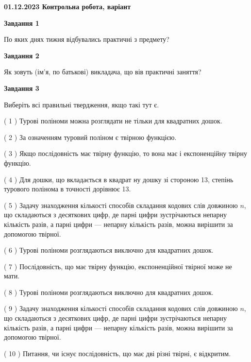 \documentclass[12pt, ukrainian]{article}
\begin{document}
\begin {large}

\textbf{01.12.2023 Контрольна робота, варіант  }\par


{
{\begin {center}\textbf{Завдання 1}\end {center}}\par
По яких днях тижня відбувались практичні з предмету?\par
{\begin {center}\textbf{Завдання 2}\end {center}}\par
Як зовуть (ім'я, по батькові) викладача, що вів практичні заняття?\par
{\begin {center}\textbf{Завдання 3}\end {center}}\par
Виберіть всі правильні твердження, якщо такі тут є.\par
\vspace{2mm}
( 1 ) Турові поліноми можна розглядати не тільки для квадратних дошок.%

( 2 ) За означенням туровий поліном є твірною функцією.%

( 3 ) Якщо послідовність має твірну функцію, то вона має і експоненційну твірну функцію.%

( 4 ) Для дошки, що вкладається в квадрат ну дошку зі стороною 13, степінь турового полінома в точності дорівнює 13.%

( 5 ) Задачу знаходження кількості способів складання кодових слів довжиною $n$, що складаються з десяткових цифр, де парні цифри зустрічаються непарну кількість разів, а парні цифри — непарну кількість разів, можна вирішити за допомогою твірної.%

( 6 ) Турові поліноми розглядаються виключно для квадратних дошок.%

( 7 ) Послідовність, що має твірну функцію, експоненційної твірної може не мати.%

( 8 ) Турові поліноми розглядаються виключно для квадратних дошок.%

( 9 ) Задачу знаходження кількості способів складання кодових слів довжиною $n$, що складаються з десяткових цифр, де парні цифри зустрічаються непарну кількість разів, а парні цифри — непарну кількість разів, можна вирішити за допомогою твірної.%

( 10 ) Питання, чи існує послідовність, що має дві різні твірні, є відкритим.%
}
\end {large}

\vspace{4mm}
\newpage
\end{document}
